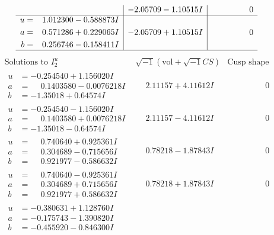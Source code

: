 \documentclass[1p]{elsarticle_modified}
\theoremstyle{definition}
\newcommand{\I}{\sqrt{-1}}
\begin{document}
$$\begin{array}{c|c|c}
 & -2.05709 - 1.10515 I & \phantom{-0.000000 } 0 \\ \hline\begin{aligned}
u &= \phantom{-}1.012300 - 0.588873 I \\
a &= \phantom{-}0.571286 + 0.229065 I \\
b &= \phantom{-}0.256746 - 0.158411 I\end{aligned}
 & -2.05709 + 1.10515 I & \phantom{-0.000000 } 0\\
 \hline 
 \end{array}$$\newpage$$\begin{array}{c|c|c}  
\text{Solutions to }I^u_{2}& \I (\text{vol} + \sqrt{-1}CS) & \text{Cusp shape}\\
 \hline 
\begin{aligned}
u &= -0.254540 + 1.156020 I \\
a &= \phantom{-}0.1403580 - 0.0076218 I \\
b &= -1.35018 + 0.64574 I\end{aligned}
 & \phantom{-}2.11157 + 4.11612 I & \phantom{-0.000000 } 0 \\ \hline\begin{aligned}
u &= -0.254540 - 1.156020 I \\
a &= \phantom{-}0.1403580 + 0.0076218 I \\
b &= -1.35018 - 0.64574 I\end{aligned}
 & \phantom{-}2.11157 - 4.11612 I & \phantom{-0.000000 } 0 \\ \hline\begin{aligned}
u &= \phantom{-}0.740640 + 0.925361 I \\
a &= \phantom{-}0.304689 - 0.715656 I \\
b &= \phantom{-}0.921977 - 0.586632 I\end{aligned}
 & \phantom{-}0.78218 - 1.87843 I & \phantom{-0.000000 } 0 \\ \hline\begin{aligned}
u &= \phantom{-}0.740640 - 0.925361 I \\
a &= \phantom{-}0.304689 + 0.715656 I \\
b &= \phantom{-}0.921977 + 0.586632 I\end{aligned}
 & \phantom{-}0.78218 + 1.87843 I & \phantom{-0.000000 } 0 \\ \hline\begin{aligned}
u &= -0.380631 + 1.128760 I \\
a &= -0.175743 - 1.390820 I \\
b &= -0.455920 - 0.846300 I\end{aligned}

\end{array}$$
\end{document}
